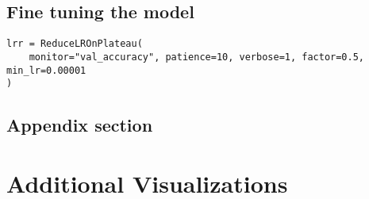 \section{Fine tuning the model}
\label{app:app-A section5}

\begin{verbatim}
lrr = ReduceLROnPlateau(
    monitor="val_accuracy", patience=10, verbose=1, factor=0.5, min_lr=0.00001
)
\end{verbatim}

\section{Appendix section}


\chapter{Additional Visualizations}